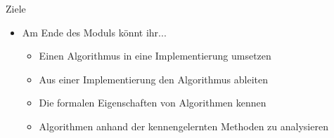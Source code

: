 
\begin{frame}{Ziele}{}
    \begin{itemize}[<+->]
        \item Am Ende des Moduls könnt ihr...
        \begin{itemize}
            \item Einen Algorithmus in eine Implementierung umsetzen
            \item Aus einer Implementierung den Algorithmus ableiten
            \item Die formalen Eigenschaften von Algorithmen kennen
            \item Algorithmen anhand der kennengelernten Methoden zu analysieren
        \end{itemize}
    \end{itemize}
\end{frame}